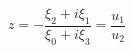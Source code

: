 \begin{equation}
z = - \frac{\xi_{2} + i \xi_{1}}{\xi_{0} +i \xi_{3}} = \frac{u_{1}}{u_{2}}
\end{equation}

